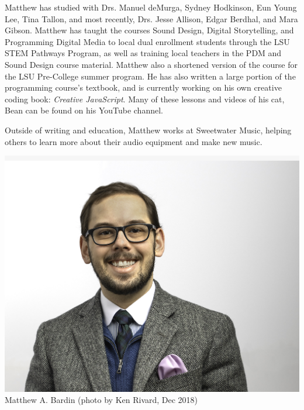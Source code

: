 Matthew has studied with Drs. Manuel deMurga, Sydney Hodkinson, Eun Young Lee, Tina Tallon, and most recently, Drs. Jesse Allison, Edgar Berdhal, and Mara Gibson. Matthew has taught the courses Sound Design, Digital Storytelling, and Programming Digital Media to local dual enrollment students through the LSU STEM Pathways Program, as well as training local teachers in the PDM and Sound Design course material. Matthew also a shortened version of the course for the LSU Pre-College summer program. He has also written a large portion of the programming course's textbook, and is currently working on his own creative coding book: \textit{Creative JavaScript}. Many of these lessons and videos of his cat, Bean can be found on his YouTube channel.

Outside of writing and education, Matthew works at Sweetwater Music, helping others to learn more about their audio equipment and make new music.


   \begin{center}
   \vspace{5mm}
       \includegraphics[scale=0.3]{Matt Bardin_web_head_4370.jpg}\\
        Matthew A. Bardin (photo by Ken Rivard, Dec 2018)
   \end{center}

